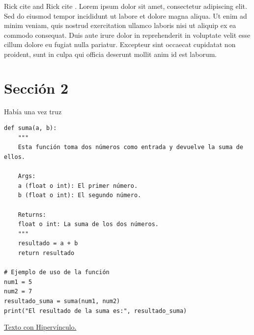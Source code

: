 Rick cite \cite{manual} and Rick cite \cite{manual}. 
Lorem ipsum dolor sit amet, consectetur adipiscing elit. Sed do eiusmod tempor incididunt ut labore et dolore magna aliqua. Ut enim ad minim veniam, quis nostrud exercitation ullamco laboris nisi ut aliquip ex ea commodo consequat. Duis aute irure dolor in reprehenderit in voluptate velit esse cillum dolore eu fugiat nulla pariatur. Excepteur sint occaecat cupidatat non proident, sunt in culpa qui officia deserunt mollit anim id est laborum.


\section{Sección 2}
\begin{tcolorbox}
[colback=white!5!white,colframe=green!75!black,fonttitle=\bfseries,title=Cuadro]
Había una vez truz
\end{tcolorbox}

\begin{tcolorbox}
[colback=white!5!white,colframe=blue!75!black,fonttitle=\bfseries,title=Cuadro con código]
\begin{verbatim}
def suma(a, b):
    """
    Esta función toma dos números como entrada y devuelve la suma de ellos.
    
    Args:
    a (float o int): El primer número.
    b (float o int): El segundo número.
    
    Returns:
    float o int: La suma de los dos números.
    """
    resultado = a + b
    return resultado

# Ejemplo de uso de la función
num1 = 5
num2 = 7
resultado_suma = suma(num1, num2)
print("El resultado de la suma es:", resultado_suma)

\end{verbatim}
\end{tcolorbox}





\href{https://youtu.be/mCdA4bJAGGk}{Texto con Hipervínculo.}


\clearpage